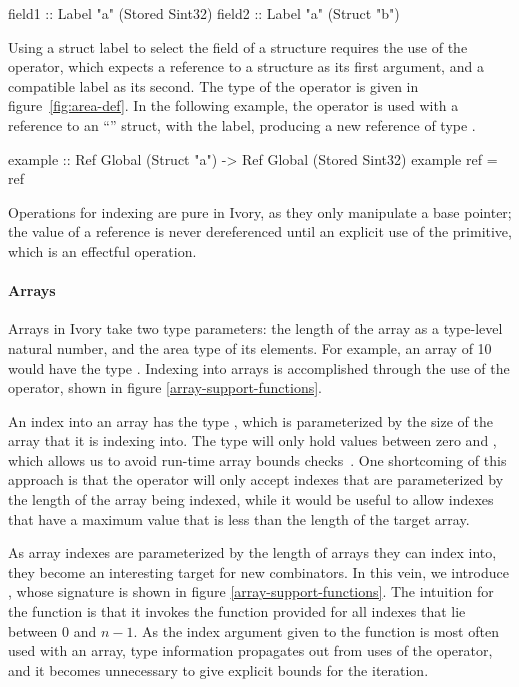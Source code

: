 \begin{code}
field1 :: Label "a" (Stored Sint32)
field2 :: Label "a" (Struct "b")
\end{code}

Using a struct label to select the field of a structure requires the use of the
\cd{(\mytilde>)} operator, which expects a reference to a structure as its first
argument, and a compatible label as its second.  The type of the
\cd{(\mytilde>)} operator is given in figure~\ref{fig:area-def}.  In the
following example, the \cd{(\mytilde>)} operator is used with a reference to an
``'' struct, with the  label, producing a new reference of type
.

\begin{code}
example :: Ref Global (Struct "a")
        -> Ref Global (Stored Sint32)
example ref = ref %
\end{code}

Operations for indexing are pure in Ivory, as they only manipulate a base
pointer; the value of a reference is never dereferenced until an explicit use of
the  primitive, which is an effectful operation.

\paragraph{Arrays}
Arrays in Ivory take two type parameters: the length of the array as a
type-level natural number, and the area type of its elements.  For example, an
array of 10  would have the type .  Indexing into arrays is accomplished through the use of the \cd{(!)}
operator, shown in figure \ref{array-support-functions}.

An index into an array has the type , which is parameterized by the size
of the array that it is indexing into.  The  type will only hold
values between zero and , which allows us to avoid run-time array bounds
checks~\cite{memareas}.  One shortcoming of this approach is that the
\cd{(!)} operator will only accept indexes that are parameterized by the length
of the array being indexed, while it would be useful to allow indexes that have
a maximum value that is less than the length of the target array.

As array indexes are parameterized by the length of arrays they can index into,
they become an interesting target for new combinators.  In this vein, we
introduce , whose signature is shown in figure
\ref{array-support-functions}.  The intuition for the  function is
that it invokes the function provided for all indexes that lie between $0$ and
$n - 1$.  As the index argument given to the function is most often used with an
array, type information propagates out from uses of the \cd{(!)} operator, and
it becomes unnecessary to give explicit bounds for the iteration.

